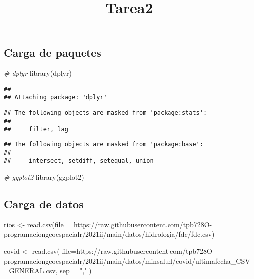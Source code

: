 \documentclass[
]{article}
\title{Tarea2}
\author{}
\date{\vspace{-2.5em}}
\newenvironment{Shaded}{\begin{snugshade}}{\end{snugshade}}
\newcommand{\AttributeTok}[1]{\textcolor[rgb]{0.77,0.63,0.00}{#1}}
\newcommand{\CommentTok}[1]{\textcolor[rgb]{0.56,0.35,0.01}{\textit{#1}}}
\newcommand{\FunctionTok}[1]{\textcolor[rgb]{0.00,0.00,0.00}{#1}}
\newcommand{\NormalTok}[1]{#1}
\newcommand{\OtherTok}[1]{\textcolor[rgb]{0.56,0.35,0.01}{#1}}
\newcommand{\StringTok}[1]{\textcolor[rgb]{0.31,0.60,0.02}{#1}}
\begin{document}
\maketitle

\hypertarget{carga-de-paquetes}{%
\subsection{Carga de paquetes}\label{carga-de-paquetes}}

\begin{Shaded}
\begin{Highlighting}[]
\CommentTok{\# dplyr}
\FunctionTok{library}\NormalTok{(dplyr)}
\end{Highlighting}
\end{Shaded}

\begin{verbatim}
## 
## Attaching package: 'dplyr'
\end{verbatim}

\begin{verbatim}
## The following objects are masked from 'package:stats':
## 
##     filter, lag
\end{verbatim}

\begin{verbatim}
## The following objects are masked from 'package:base':
## 
##     intersect, setdiff, setequal, union
\end{verbatim}

\begin{Shaded}
\begin{Highlighting}[]
\CommentTok{\# ggplot2}
\FunctionTok{library}\NormalTok{(ggplot2)}
\end{Highlighting}
\end{Shaded}

\hypertarget{carga-de-datos}{%
\subsection{Carga de datos}\label{carga-de-datos}}

\begin{Shaded}
\begin{Highlighting}[]
\NormalTok{rios }\OtherTok{\textless{}{-}}
  \FunctionTok{read.csv}\NormalTok{(}\AttributeTok{file =} \StringTok{\textquotesingle{}https://raw.githubusercontent.com/tpb728O{-}programaciongeoespacialr/2021ii/main/datos/hidrologia/fdc/fdc.csv\textquotesingle{}}\NormalTok{)}

\NormalTok{covid }\OtherTok{\textless{}{-}} 
  \FunctionTok{read.csv}\NormalTok{(}
    \AttributeTok{file=}\StringTok{\textquotesingle{}https://raw.githubusercontent.com/tpb728O{-}programaciongeoespacialr/2021ii/main/datos/minsalud/covid/ultimafecha\_CSV\_GENERAL.csv\textquotesingle{}}\NormalTok{, }
    \AttributeTok{sep =} \StringTok{","}
\NormalTok{  )}
\end{Highlighting}
\end{Shaded}
\end{document}
